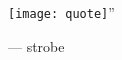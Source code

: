 
\pagebreak
\thispagestyle{empty}
\null\vfill

\begin{minipage}[b]{\linewidth}
    \centering
    \Huge{\raisebox{4.5cm}{``}
    \texttt{[image: quote]}''}

    \raggedleft\small{--- strobe}\par%
\end{minipage}
\vfill\vfill
\clearpage
\pagebreak
